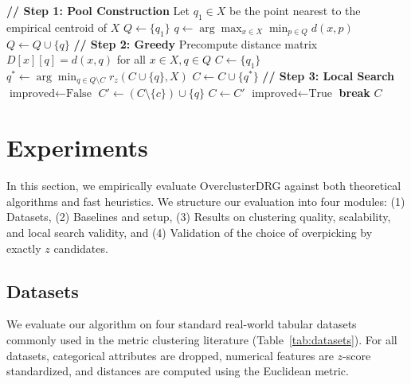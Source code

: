 \documentclass[twoside,leqno,twocolumn]{article}
\begin{document}
\begin{algorithm}[]
\caption{OverclusterDRG($X, k, z$)}
\label{alg:overcluster}
\begin{algorithmic}[1]
\STATE \textbf{// Step 1: Pool Construction}
\STATE Let $q_1 \in X$ be the point nearest to the empirical centroid of $X$
\STATE $Q \gets \{q_1\}$
    \STATE $q \gets \arg\max_{x \in X} \min_{p \in Q} d(x, p)$
    \STATE $Q \gets Q \cup \{q\}$
\ENDWHILE
\STATE \textbf{// Step 2: Greedy}
\STATE Precompute distance matrix $D[x][q] = d(x,q)$ for all $x \in X, q \in Q$
\STATE $C \gets \{q_1\}$
    \STATE $q^* \gets \arg\min_{q \in Q \setminus C} r_z(C \cup \{q\}, X)$
    \STATE $C \gets C \cup \{q^*\}$
\ENDWHILE
\STATE \textbf{// Step 3: Local Search}
\REPEAT
    \STATE $\text{improved} \gets \text{False}$
        \STATE $C' \gets (C \setminus \{c\}) \cup \{q\}$
            \STATE $C \gets C'$
            \STATE $\text{improved} \gets \text{True}$
            \STATE \textbf{break}
        \ENDIF
    \ENDFOR
{}
\RETURN $C$
\end{algorithmic}
\end{algorithm}


\section{Experiments}
\label{sec:experiments}

In this section, we empirically evaluate OverclusterDRG against both theoretical algorithms and fast heuristics. We structure our evaluation into four modules: (1) Datasets, (2) Baselines and setup, (3) Results on clustering quality, scalability, and local search validity, and (4) Validation of the choice of overpicking by exactly $z$ candidates.

\subsection{Datasets}
We evaluate our algorithm on four standard real-world tabular datasets commonly used in the metric clustering literature (Table~\ref{tab:datasets}). For all datasets, categorical attributes are dropped, numerical features are $z$-score standardized, and distances are computed using the Euclidean metric.
\end{document}
